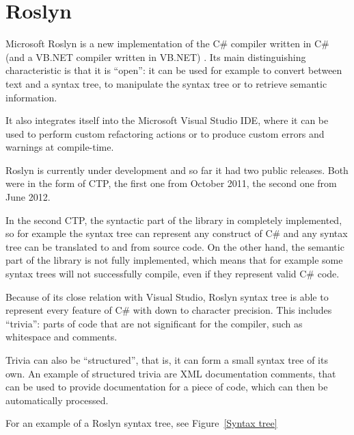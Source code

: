 \section{Roslyn}
\label{roslyn}

Microsoft Roslyn is a new implementation of the C\# compiler written in C\#
(and a \ac{VB.NET} compiler written in \ac{VB.NET}) \cite{roslyn}.
Its main distinguishing characteristic is that it is “open”:
it can be used for example to convert between text and a syntax tree,
to manipulate the syntax tree or to retrieve semantic information.

It also integrates itself into the Microsoft Visual Studio \ac{IDE},
where it can be used to perform
custom refactoring actions or to produce custom errors and warnings at compile-time.

Roslyn is currently under development and so far it had two public releases.
Both were in the form of \ac{CTP},
the first one from October 2011, the second one from June 2012.

In the second \ac{CTP}, the syntactic part of the library in completely implemented,
so for example the syntax tree can represent any construct of C\#
and any syntax tree can be translated to and from source code.
On the other hand, the semantic part of the library is not fully implemented,
which means that for example some syntax trees will not successfully compile,
even if they represent valid C\# code.

Because of its close relation with Visual Studio,
Roslyn syntax tree is able to represent every feature of C\# with down to character precision.
This includes “trivia”: parts of code that are not significant for the compiler,
such as whitespace and comments.

Trivia can also be “structured”, that is, it can form a small syntax tree of its own.
An example of structured trivia are \ac{XML} documentation comments,
that can be used to provide documentation for a piece of code,
which can then be automatically processed.

For an example of a Roslyn syntax tree, see Figure~\ref{Syntax tree}

